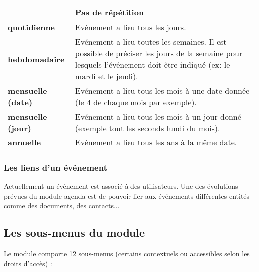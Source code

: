 \begin{tabular}{|p{3cm}|p{10cm}|}
\hline
\textbf{---} & Pas de répétition\\
\hline
\textbf{quotidienne} & Evénement a lieu tous les jours.\\
\hline
\textbf{hebdomadaire} & Evénement a lieu toutes les semaines. Il est possible de préciser les jours de la semaine pour lesquels l'événement doit être indiqué (ex: le mardi et le jeudi).\\
\hline
\textbf{mensuelle (date)} & Evénement a lieu tous les mois à une date donnée (le 4 de chaque mois par exemple).\\
\hline
\textbf{mensuelle (jour)} & Evénement a lieu tous les mois à un jour donné (exemple tout les seconds lundi du mois).\\
\hline
\textbf{annuelle} & Evénement a lieu tous les ans à la même date.\\
\hline
\end{tabular}


\subsubsection{Les liens d'un événement}

Actuellement un événement est associé à des utilisateurs.
Une des évolutions prévues du module agenda est de pouvoir lier aux événements différentes entités comme des documents, des contacts...


\subsection{Les sous-menus du module \agenda}

Le module \agenda comporte 12 sous-menus (certains contextuels ou accessibles selon les droits d'accès)
:\\

